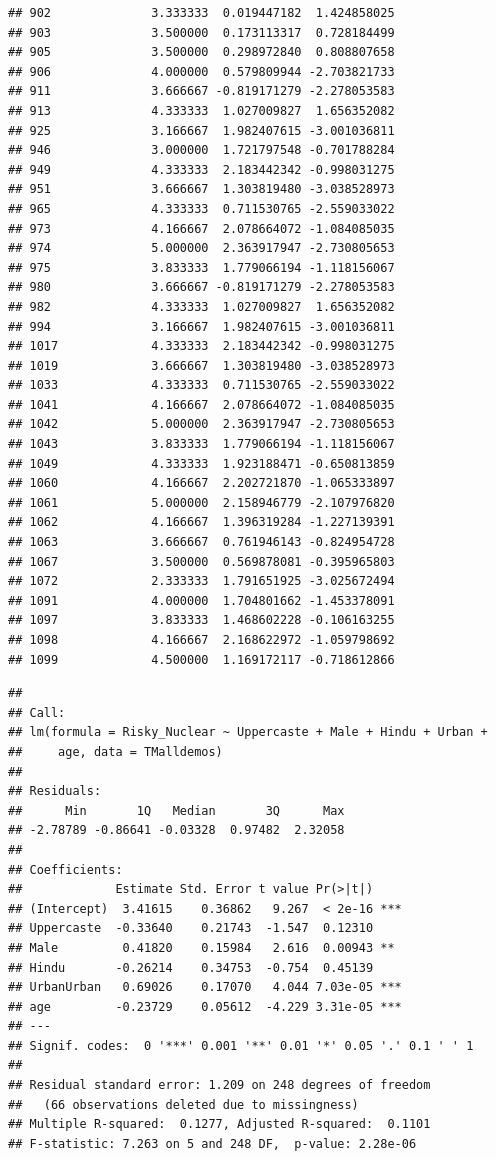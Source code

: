 \documentclass[
]{article}
\begin{document}
\begin{verbatim}
## 902              3.333333  0.019447182  1.424858025
## 903              3.500000  0.173113317  0.728184499
## 905              3.500000  0.298972840  0.808807658
## 906              4.000000  0.579809944 -2.703821733
## 911              3.666667 -0.819171279 -2.278053583
## 913              4.333333  1.027009827  1.656352082
## 925              3.166667  1.982407615 -3.001036811
## 946              3.000000  1.721797548 -0.701788284
## 949              4.333333  2.183442342 -0.998031275
## 951              3.666667  1.303819480 -3.038528973
## 965              4.333333  0.711530765 -2.559033022
## 973              4.166667  2.078664072 -1.084085035
## 974              5.000000  2.363917947 -2.730805653
## 975              3.833333  1.779066194 -1.118156067
## 980              3.666667 -0.819171279 -2.278053583
## 982              4.333333  1.027009827  1.656352082
## 994              3.166667  1.982407615 -3.001036811
## 1017             4.333333  2.183442342 -0.998031275
## 1019             3.666667  1.303819480 -3.038528973
## 1033             4.333333  0.711530765 -2.559033022
## 1041             4.166667  2.078664072 -1.084085035
## 1042             5.000000  2.363917947 -2.730805653
## 1043             3.833333  1.779066194 -1.118156067
## 1049             4.333333  1.923188471 -0.650813859
## 1060             4.166667  2.202721870 -1.065333897
## 1061             5.000000  2.158946779 -2.107976820
## 1062             4.166667  1.396319284 -1.227139391
## 1063             3.666667  0.761946143 -0.824954728
## 1067             3.500000  0.569878081 -0.395965803
## 1072             2.333333  1.791651925 -3.025672494
## 1091             4.000000  1.704801662 -1.453378091
## 1097             3.833333  1.468602228 -0.106163255
## 1098             4.166667  2.168622972 -1.059798692
## 1099             4.500000  1.169172117 -0.718612866
\end{verbatim}

\begin{verbatim}
## 
## Call:
## lm(formula = Risky_Nuclear ~ Uppercaste + Male + Hindu + Urban + 
##     age, data = TMalldemos)
## 
## Residuals:
##      Min       1Q   Median       3Q      Max 
## -2.78789 -0.86641 -0.03328  0.97482  2.32058 
## 
## Coefficients:
##             Estimate Std. Error t value Pr(>|t|)    
## (Intercept)  3.41615    0.36862   9.267  < 2e-16 ***
## Uppercaste  -0.33640    0.21743  -1.547  0.12310    
## Male         0.41820    0.15984   2.616  0.00943 ** 
## Hindu       -0.26214    0.34753  -0.754  0.45139    
## UrbanUrban   0.69026    0.17070   4.044 7.03e-05 ***
## age         -0.23729    0.05612  -4.229 3.31e-05 ***
## ---
## Signif. codes:  0 '***' 0.001 '**' 0.01 '*' 0.05 '.' 0.1 ' ' 1
## 
## Residual standard error: 1.209 on 248 degrees of freedom
##   (66 observations deleted due to missingness)
## Multiple R-squared:  0.1277, Adjusted R-squared:  0.1101 
## F-statistic: 7.263 on 5 and 248 DF,  p-value: 2.28e-06
\end{verbatim}
\end{document}
